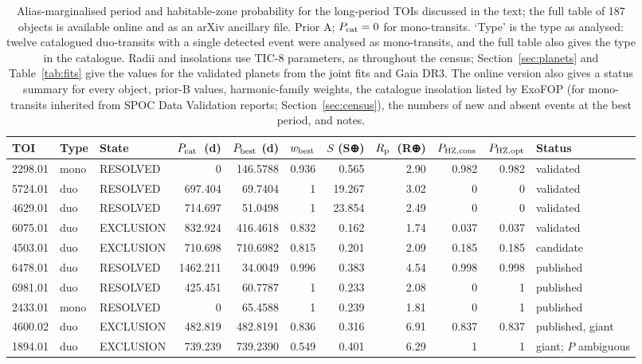 \documentclass[fleqn,usenatbib]{mnras}
\newcommand{\Pcat}{\ensuremath{P_{\rm cat}}}
\newcommand{\Rp}{\ensuremath{R_{\rm p}}}
\begin{document}
\begin{table}
\centering
\caption{Alias-marginalised period and habitable-zone probability for the long-period TOIs discussed in the text; the full table of 187 objects is available online and as an arXiv ancillary file. Prior A; $\Pcat = 0$ for mono-transits. `Type' is the type as analysed: twelve catalogued duo-transits with a single detected event were analysed as mono-transits, and the full table also gives the type in the catalogue. Radii and insolations use TIC-8 parameters, as throughout the census; Section~\ref{sec:planets} and Table~\ref{tab:fits} give the values for the validated planets from the joint fits and Gaia DR3. The online version also gives a status summary for every object, prior-B values, harmonic-family weights, the catalogue insolation listed by ExoFOP (for mono-transits inherited from SPOC Data Validation reports; Section~\ref{sec:census}), the numbers of new and absent events at the best period, and notes.}
\label{tab:catalogue}
\small
\setlength{\tabcolsep}{3.5pt}
\begin{tabular}{lllrrrrrrrl}
\toprule
TOI & Type & State & \Pcat\ (d) & $P_{\rm best}$ (d) & $w_{\rm best}$ & $S$ (S⊕) & \Rp\ (R⊕) & $P_{\rm HZ,cons}$ & $P_{\rm HZ,opt}$ & Status \\
\midrule
2298.01 & mono & RESOLVED & 0 & 146.5788 & 0.936 & 0.565 & 2.90 & 0.982 & 0.982 & validated \\
5724.01 & duo & RESOLVED & 697.404 & 69.7404 & 1 & 19.267 & 3.02 & 0 & 0 & validated \\
4629.01 & duo & RESOLVED & 714.697 & 51.0498 & 1 & 23.854 & 2.49 & 0 & 0 & validated \\
6075.01 & duo & EXCLUSION & 832.924 & 416.4618 & 0.832 & 0.162 & 1.74 & 0.037 & 0.037 & validated \\
4503.01 & duo & EXCLUSION & 710.698 & 710.6982 & 0.815 & 0.201 & 2.09 & 0.185 & 0.185 & candidate \\
6478.01 & duo & RESOLVED & 1462.211 & 34.0049 & 0.996 & 0.383 & 4.54 & 0.998 & 0.998 & published \\
6981.01 & duo & RESOLVED & 425.451 & 60.7787 & 1 & 0.233 & 2.08 & 0 & 1 & published \\
2433.01 & mono & RESOLVED & 0 & 65.4588 & 1 & 0.239 & 1.81 & 0 & 1 & published \\
4600.02 & duo & EXCLUSION & 482.819 & 482.8191 & 0.836 & 0.316 & 6.91 & 0.837 & 0.837 & published, giant \\
1894.01 & duo & EXCLUSION & 739.239 & 739.2390 & 0.549 & 0.401 & 6.29 & 1 & 1 & giant; $P$ ambiguous \\

\end{tabular}
\end{table}
\end{document}
